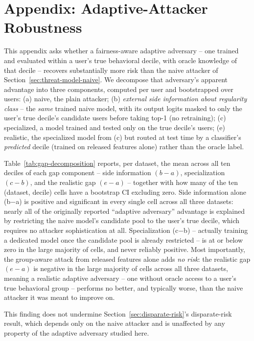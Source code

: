 \section{Appendix: Adaptive-Attacker Robustness}
\label{sec:adaptive-appendix}

This appendix asks whether a fairness-aware adaptive adversary -- one
trained and evaluated within a user's true behavioral decile, with
oracle knowledge of that decile -- recovers substantially more risk
than the naive attacker of Section~\ref{sec:threat-model-naive}. We
decompose that adversary's
apparent advantage into three components, computed per user and
bootstrapped over users: (a) naive, the plain attacker;
(b) \emph{external side information about regularity class} -- the
\emph{same} trained naive model, with its output logits masked to only
the user's true decile's candidate users before taking top-1 (no
retraining); (c) specialized, a model trained and tested only on the
true decile's users; (e) realistic, the specialized model from (c) but
routed at test time by a classifier's \emph{predicted} decile (trained
on released features alone) rather than the oracle label.

Table~\ref{tab:gap-decomposition} reports, per dataset, the mean across
all ten deciles of each gap component -- side information $(b-a)$,
specialization $(c-b)$, and the realistic gap $(e-a)$ -- together with
how many of the ten (dataset, decile) cells have a bootstrap CI
excluding zero. Side information alone (b$-$a) is positive and
significant in every single cell across all three datasets: nearly all
of the originally reported ``adaptive adversary'' advantage is
explained by restricting the naive model's candidate pool to the
user's true decile, which requires no attacker sophistication at all.
Specialization (c$-$b) -- actually training a dedicated model once the
candidate pool is already restricted -- is at or below zero in the
large majority of cells, and never reliably positive. Most
importantly, the group-aware attack from released features alone adds
\emph{no risk}: the realistic gap $(e-a)$ is negative in the large
majority of cells across all three datasets, meaning a realistic
adaptive adversary -- one without oracle access to a user's true
behavioral group -- performs no better, and typically worse, than the
naive attacker it was meant to improve on.



This finding does not undermine Section~\ref{sec:disparate-risk}'s
disparate-risk result, which depends only on the naive attacker and is
unaffected by any property of the adaptive adversary studied here.

